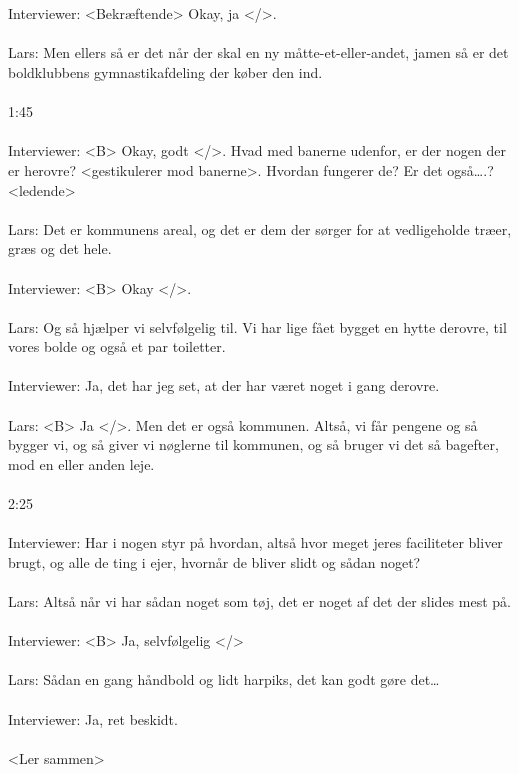 \\\\
Interviewer: <Bekræftende> Okay, ja </>.
\\\\
Lars: Men ellers så er det når der skal en ny måtte-et-eller-andet, jamen så er det boldklubbens gymnastikafdeling der køber den ind.
\\\\
1:45
\\\\
Interviewer: <B> Okay, godt </>. Hvad med banerne udenfor, er der nogen der er herovre? <gestikulerer mod banerne>. Hvordan fungerer de? Er det også….? <ledende>
\\\\
Lars: Det er kommunens areal, og det er dem der sørger for at vedligeholde træer, græs og det hele.
\\\\
Interviewer: <B> Okay </>.
\\\\
Lars: Og så hjælper vi selvfølgelig til. Vi har lige fået bygget en hytte derovre, til vores bolde og også et par toiletter.
\\\\
Interviewer: Ja, det har jeg set, at der har været noget i gang derovre.
\\\\
Lars: <B> Ja </>. Men det er også kommunen. Altså, vi får pengene og så bygger vi, og så giver vi nøglerne til kommunen, og så bruger vi det så bagefter, mod en eller anden leje.
\\\\
2:25
\\\\
Interviewer: Har i nogen styr på hvordan, altså hvor meget jeres faciliteter bliver brugt, og alle de ting i ejer, hvornår de bliver slidt og sådan noget?
\\\\
Lars: Altså når vi har sådan noget som tøj, det er noget af det der slides mest på.
\\\\
Interviewer: <B> Ja, selvfølgelig </>
\\\\
Lars: Sådan en gang håndbold og lidt harpiks, det kan godt gøre det…
\\\\
Interviewer: Ja, ret beskidt.
\\\\
<Ler sammen>
